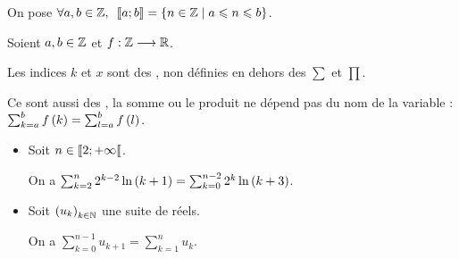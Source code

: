 \begin{nota}
On pose \(\quantifs{\forall a,b\in\Z}\interventierii{a}{b}=\accol{n\in\Z\tq a\leq n\leq b}\).
\end{nota}

\begin{nota}
Soient \(a,b\in\mathbb{Z}\) et \(f:\mathbb{Z}\longrightarrow\mathbb{R}\).

\end{nota}

\begin{rem}
Les indices \(k\) et \(x\) sont des , non définies en dehors des \(\sum\) et \(\prod\).

Ce sont aussi des , la somme ou le produit ne dépend pas du nom de la variable : \(\sum_{k=a}^b f\left(k\right)=\sum_{l=a}^b f\left(l\right)\).
\end{rem}

\begin{rem}
\begin{itemize}
\item Soit \(n\in\left\llbracket2;+\infty\right\llbracket\).

On a \(\sum_{k=2}^n2^{k-2}\ln\left(k+1\right)=\sum_{k=0}^{n-2}2^k\ln\left(k+3\right)\).

\item Soit \(\left(u_k\right)_{k\in\mathbb{N}}\) une suite de réels.

On a \(\sum_{k=0}^{n-1}u_{k+1}=\sum_{k=1}^n u_k\).
\end{itemize}
\end{rem}

